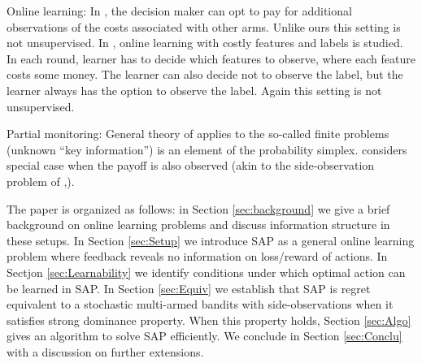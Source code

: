 Online learning: In 
\cite{SBCA14:BanditsPaid}, the decision maker can opt to pay for additional observations of the costs associated with other arms. Unlike ours this setting is not unsupervised. In
\citet{ZBGGySz13:CostlyFeatures}, online learning with costly features and labels is studied.
In each round, learner has to decide which features to observe, where each feature costs some money. The learner can also decide not to observe the label, but the learner always has the option
to observe the label. Again this setting is not unsupervised.

Partial monitoring:
General theory of \citet{BaFoPaRaSze14} 
applies to the so-called finite problems (unknown ``key information'') is an element of the probability simplex.
\citet{AgTeAn89:pmon} considers special case when the payoff is also observed (akin to the side-observation problem of \citet{MaSh11}\cite{COLT15_OnlineLearningWithFeedback_AlonBianchiDekel},\cite{NIPS13_FromBanditsToExperts_AlonBianchiGentile}).

The paper is organized as follows: in Section \ref{sec:background} we give a brief background on online learning problems and discuss information structure in these setups. In Section \ref{sec:Setup} we introduce SAP as a general online learning problem where feedback reveals no information on loss/reward of actions. In Sectjon \ref{sec:Learnability} we identify conditions under which optimal action can be learned in SAP. In Section \ref{sec:Equiv} we establish that SAP is regret equivalent to a stochastic multi-armed bandits with side-observations when it satisfies strong dominance property. When this property holds, Section \ref{sec:Algo} gives an algorithm to solve SAP efficiently. We conclude in Section \ref{sec:Conclu} with a discussion on further extensions.  